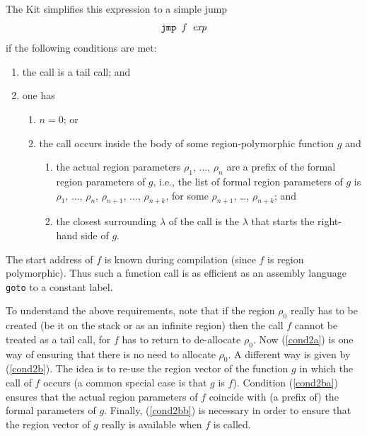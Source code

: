\documentclass[12pt]{book}
\begin{document}
The Kit simplifies this expression to a simple jump
$$\hbox{\tt jmp $f$ $\hbox{\it exp}$}$$
if the following conditions are met:
\begin{enumerate}
  \item \label{cond1}
    the call is a tail call; and
  \item \label{cond2}
    one has 
      \begin{enumerate}
         \item \label{cond2a} $n=0$; or
         \item \label{cond2b} the call occurs 
               inside the body of some region-polymorphic
               function $g$ and
                 \begin{enumerate}
                   \item \label{cond2ba}
                       the actual region parameters 
                       $\rho_1$, $\ldots$, $\rho_n$ are a prefix
                       of the formal region parameters of $g$, 
                       i.e., the list of formal region parameters of $g$
                       is \boxml{[}$\rho_1$, $\ldots$, $\rho_n$, 
                       $\rho_{n+1}$, $\ldots$, $\rho_{n+k}$\boxml{]}, 
                       for some
                       $\rho_{n+1}$, \ldots, $\rho_{n+k}$; and 
                   \item \label{cond2bb}
                       the closest surrounding $\lambda$ of the call 
                       is the $\lambda$ that starts the
                       right-hand side of $g$.
                  \end{enumerate}
       \end{enumerate}
\end{enumerate}
The start address of $f$ is known during compilation (since
$f$ is region polymorphic). Thus such a function call
is as efficient as an assembly language {\tt goto} to a constant
label.

To understand the above requirements, 
note that if the region $\rho_0$ really has to be created (be
it on the stack or as an infinite region) then the call $f$ cannot
be treated as a tail call, for $f$ has to return to de-allocate
$\rho_0$. Now (\ref{cond2a}) is one way of ensuring
that there is no need to allocate $\rho_0$. A different way
is given by (\ref{cond2b}). The idea is to re-use the region vector
of the function $g$ in which the call of $f$ occurs (a common special case
is that $g$ is $f$). Condition (\ref{cond2ba}) ensures that the
actual region parameters of $f$ coincide with (a prefix of) the formal
parameters of $g$. Finally, (\ref{cond2bb}) is necessary in order to
ensure that the region vector of $g$ really is available when $f$
is called.
\end{document}
